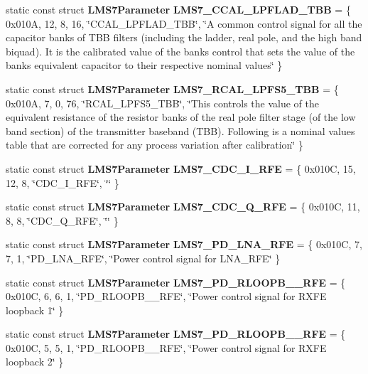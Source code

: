 \begin{DoxyCompactItemize}
\item 
static const struct {\bf L\+M\+S7\+Parameter} {\bf L\+M\+S7\+\_\+\+C\+C\+A\+L\+\_\+\+L\+P\+F\+L\+A\+D\+\_\+\+T\+BB} = \{ 0x010\+A, 12, 8, 16, \char`\"{}\+C\+C\+A\+L\+\_\+\+L\+P\+F\+L\+A\+D\+\_\+\+T\+B\+B\char`\"{}, \char`\"{}\+A common control signal for all the capacitor banks of T\+B\+B filters (including the ladder, real pole, and the high band biquad). It is the calibrated value of the banks control that sets the value of the banks\textquotesingle{} equivalent capacitor to their respective nominal values\char`\"{} \}
\item 
static const struct {\bf L\+M\+S7\+Parameter} {\bf L\+M\+S7\+\_\+\+R\+C\+A\+L\+\_\+\+L\+P\+F\+S5\+\_\+\+T\+BB} = \{ 0x010\+A, 7, 0, 76, \char`\"{}\+R\+C\+A\+L\+\_\+\+L\+P\+F\+S5\+\_\+\+T\+B\+B\char`\"{}, \char`\"{}\+This controls the value of the equivalent resistance of the resistor banks of the real pole filter stage (of the low band section) of the transmitter baseband (\+T\+B\+B). Following is a nominal values table that are corrected for any process variation after calibration\char`\"{} \}
\item 
static const struct {\bf L\+M\+S7\+Parameter} {\bf L\+M\+S7\+\_\+\+C\+D\+C\+\_\+\+I\+\_\+\+R\+FE} = \{ 0x010\+C, 15, 12, 8, \char`\"{}\+C\+D\+C\+\_\+\+I\+\_\+\+R\+F\+E\char`\"{}, \char`\"{}\char`\"{} \}
\item 
static const struct {\bf L\+M\+S7\+Parameter} {\bf L\+M\+S7\+\_\+\+C\+D\+C\+\_\+\+Q\+\_\+\+R\+FE} = \{ 0x010\+C, 11, 8, 8, \char`\"{}\+C\+D\+C\+\_\+\+Q\+\_\+\+R\+F\+E\char`\"{}, \char`\"{}\char`\"{} \}
\item 
static const struct {\bf L\+M\+S7\+Parameter} {\bf L\+M\+S7\+\_\+\+P\+D\+\_\+\+L\+N\+A\+\_\+\+R\+FE} = \{ 0x010\+C, 7, 7, 1, \char`\"{}\+P\+D\+\_\+\+L\+N\+A\+\_\+\+R\+F\+E\char`\"{}, \char`\"{}\+Power control signal for L\+N\+A\+\_\+\+R\+F\+E\char`\"{} \}
\item 
static const struct {\bf L\+M\+S7\+Parameter} {\bf L\+M\+S7\+\_\+\+P\+D\+\_\+\+R\+L\+O\+O\+P\+B\+\_\+\_\+\+R\+FE} = \{ 0x010\+C, 6, 6, 1, \char`\"{}\+P\+D\+\_\+\+R\+L\+O\+O\+P\+B\+\_\+\_\+\+R\+F\+E\char`\"{}, \char`\"{}\+Power control signal for R\+X\+F\+E loopback 1\char`\"{} \}
\item 
static const struct {\bf L\+M\+S7\+Parameter} {\bf L\+M\+S7\+\_\+\+P\+D\+\_\+\+R\+L\+O\+O\+P\+B\+\_\+\_\+\+R\+FE} = \{ 0x010\+C, 5, 5, 1, \char`\"{}\+P\+D\+\_\+\+R\+L\+O\+O\+P\+B\+\_\+\_\+\+R\+F\+E\char`\"{}, \char`\"{}\+Power control signal for R\+X\+F\+E loopback 2\char`\"{} \}
\item 

\end{DoxyCompactItemize}
